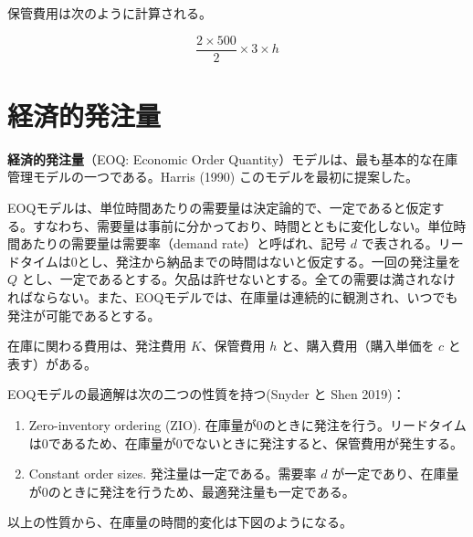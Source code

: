 \documentclass[
  japanese,
  letterpaper,
]{ltjbook}
\providecommand{\tightlist}{%
  \setlength{\itemsep}{0pt}\setlength{\parskip}{0pt}}
\theoremstyle{plain}
\theoremstyle{definition}
\theoremstyle{remark}
\begin{document}
保管費用は次のように計算される。

\[
\frac{2 \times 500}{2} \times 3 \times h
\]

\chapter{経済的発注量}\label{ux7d4cux6e08ux7684ux767aux6ce8ux91cf}

\textbf{経済的発注量}（EOQ: Economic Order
Quantity）モデルは、最も基本的な在庫管理モデルの一つである。Harris
(1990) このモデルを最初に提案した。

EOQモデルは、単位時間あたりの需要量は決定論的で、一定であると仮定する。すなわち、需要量は事前に分かっており、時間とともに変化しない。単位時間あたりの需要量は需要率（demand
rate）と呼ばれ、記号 \(d\)
で表される。リードタイムは0とし、発注から納品までの時間はないと仮定する。一回の発注量を
\(Q\)
とし、一定であるとする。欠品は許せないとする。全ての需要は満されなければならない。また、EOQモデルでは、在庫量は連続的に観測され、いつでも発注が可能であるとする。

在庫に関わる費用は、発注費用 \(K\)、保管費用 \(h\)
と、購入費用（購入単価を \(c\) と表す）がある。

EOQモデルの最適解は次の二つの性質を持つ(Snyder と Shen 2019)：

\begin{enumerate}
\def\labelenumi{\arabic{enumi}.}
\tightlist
\item
  Zero-inventory ordering (ZIO).
  在庫量が0のときに発注を行う。リードタイムは0であるため、在庫量が0でないときに発注すると、保管費用が発生する。
\item
  Constant order sizes. 発注量は一定である。需要率 \(d\)
  が一定であり、在庫量が0のときに発注を行うため、最適発注量も一定である。
\end{enumerate}

以上の性質から、在庫量の時間的変化は下図のようになる。
\end{document}
